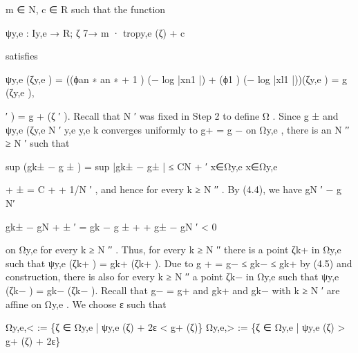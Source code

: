 \documentclass[
  10pt,
]{article}
\newenvironment{Shaded}{}{}
\newcommand{\NormalTok}[1]{#1}
\begin{document}
\begin{Shaded}
\begin{Highlighting}[]
\NormalTok{m ∈ N, c ∈ R such that the function}

\NormalTok{                              ψy,e : Iy,e → R; ζ 7→ m · tropy,e (ζ) + c}

\NormalTok{satisfies}

\NormalTok{            ψy,e (ζy,e ) = ((ϕan ∗                   an ∗                          +}
\NormalTok{                              1 ) (− log |xn1 |) + (ϕ1 ) (− log |xl1 |))(ζy,e ) = g (ζy,e ),}

\NormalTok{           ′ ) = g + (ζ ′ ). Recall that N ′ was fixed in Step 2 to define Ω . Since g ±}
\NormalTok{and ψy,e (ζy,e    N ′ y,e                                                   y,e       k}
\NormalTok{converges uniformly to g+ = g − on Ωy,e , there is an N ′′ ≥ N ′ such that}

\NormalTok{                             sup (gk± − g ± ) = sup |gk± − g± | ≤ CN}
\NormalTok{                                                                   +}
\NormalTok{                                                                     ′}
\NormalTok{                            x∈Ωy,e                   x∈Ωy,e}

\NormalTok{                                        +       ± = C + + 1/N ′ , and hence}
\NormalTok{for every k ≥ N ′′ . By (4.4), we have gN ′ − g      N′}

\NormalTok{                               gk± − gN}
\NormalTok{                                      +      ±}
\NormalTok{                                        ′ = gk − g}
\NormalTok{                                                   ±         +}
\NormalTok{                                                     + g± − gN ′ \textless{} 0}


\NormalTok{on Ωy,e for every k ≥ N ′′ . Thus, for every k ≥ N ′′ there is a point ζk+ in Ωy,e such that}
\NormalTok{ψy,e (ζk+ ) = gk+ (ζk+ ). Due to g + = g− ≤ gk− ≤ gk+ by (4.5) and construction, there is also}
\NormalTok{for every k ≥ N ′′ a point ζk− in Ωy,e such that ψy,e (ζk− ) = gk− (ζk− ). Recall that g− = g+}
\NormalTok{and gk+ and gk− with k ≥ N ′ are affine on Ωy,e .}
\NormalTok{   We choose ε such that}

\NormalTok{                           Ωy,e,\textless{} := \{ζ ∈ Ωy,e | ψy,e (ζ) + 2ε \textless{} g+ (ζ)\}}
\NormalTok{                           Ωy,e,\textgreater{} := \{ζ ∈ Ωy,e | ψy,e (ζ) \textgreater{} g+ (ζ) + 2ε\}}


\end{Highlighting}
\end{Shaded}
\end{document}
